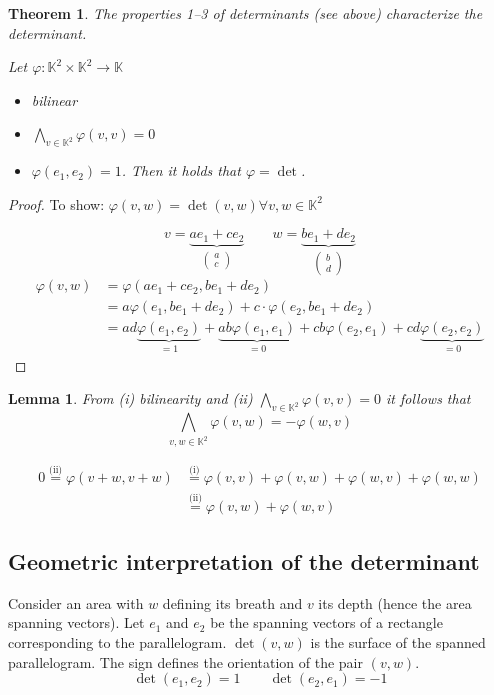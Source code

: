 \documentclass[a4paper,landscape,twocolumn]{article}
\newtheorem{theorem}{Theorem}
\newtheorem{lemma}{Lemma}
\begin{document}
\begin{theorem}
  \label{satz-7.3}
  The properties 1--3 of determinants (see above) characterize the determinant.

  Let $\varphi: \mathbb K^2 \times \mathbb K^2 \to \mathbb K$
  \begin{itemize}
    \item bilinear
    \item $\bigwedge_{v \in \mathbb K^2} \varphi(v,v) = 0$
    \item $\varphi(e_1, e_2) = 1$.
      Then it holds that $\varphi = \det$.
  \end{itemize}
\end{theorem}
\begin{proof}
  To show: $\varphi(v,w) = \det(v,w) \forall v,w \in \mathbb K^2$

  \[
    v = \underbrace{a e_1 + c e_2}_{\begin{pmatrix} a \\ c \end{pmatrix}}
    \qquad
    w = \underbrace{b e_1 + d e_2}_{\begin{pmatrix} b \\ d \end{pmatrix}}
  \] \begin{align*}
    \varphi(v,w) &= \varphi(a e_1 + c e_2, b e_1 + d e_2) \\
      &= a\varphi(e_1, be_1 + de_2) + c \cdot \varphi(e_2, be_1 + de_2) \\
      &= ad \underbrace{\varphi(e_1, e_2)}_{=1} + \underbrace{ab \varphi(e_1, e_1)}_{=0} + cb \varphi(e_2, e_1) + cd \underbrace{\varphi(e_2, e_2)}_{=0}
  \end{align*}
\end{proof}

\begin{lemma}
  \label{lemma-7.4}
  From (i) bilinearity and (ii) $\bigwedge_{v \in \mathbb K^2} \varphi(v,v) = 0$ it follows that
  \[ \bigwedge_{v,w \in \mathbb K^2} \varphi(v,w) = - \varphi(w, v) \]

  \begin{align*}
    0 \overset{\text{(ii)}}{=} \varphi(v+w, v+w)
      &\overset{\text{(i)}}{=} \varphi(v,v) + \varphi(v,w) + \varphi(w,v) + \varphi(w,w) \\
      &\overset{\text{(ii)}}{=} \varphi(v,w) + \varphi(w,v)
  \end{align*}
\end{lemma}

\subsection{Geometric interpretation of the determinant}
%
Consider an area with $w$ defining its breath and $v$ its depth (hence the area spanning vectors).
Let $e_1$ and $e_2$ be the spanning vectors of a rectangle corresponding to the parallelogram.
$\det(v,w)$ is the surface of the spanned parallelogram.
The sign defines the orientation of the pair $(v, w)$.
\[ \det(e_1, e_2) = 1 \qquad \det(e_2, e_1) = -1 \]
\end{document}
